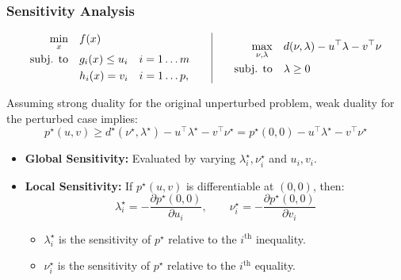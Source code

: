 \subsubsection{Sensitivity Analysis}

\[
\begin{array}{@{}c@{\qquad}|@{\qquad}c@{}}
    \begin{aligned}
        \min_{x} \quad & f(x) \\
        \text{subj. to} \quad & g_i(x) \le u_i \quad i=1\ldots m \\
        & h_i(x) = v_i \quad i=1\ldots p,
    \end{aligned}
    &
    \begin{aligned}
        \max_{\nu, \lambda} \quad & d(\nu, \lambda) - u^\top \lambda - v^\top \nu \\
        \text{subj. to} \quad & \lambda \ge 0
    \end{aligned}
\end{array}
\]

Assuming strong duality for the original unperturbed problem, weak duality for the perturbed case implies:
\[
    p^\star(u,v) \ge d^\star(\nu^\star, \lambda^\star) - u^\top\lambda^\star - v^\top\nu^\star = p^\star(0,0) - u^\top\lambda^\star - v^\top\nu^\star
\]

\begin{itemize}
    \item \textbf{Global Sensitivity:} Evaluated by varying $\lambda_i^\star, \nu_i^\star$ and $u_i, v_i$.
    
    \item \textbf{Local Sensitivity:} If $p^\star(u, v)$ is differentiable at $(0, 0)$, then:
    \[
        \lambda_i^\star = -\frac{\partial p^\star(0, 0)}{\partial u_i}, \qquad \nu_i^\star = -\frac{\partial p^\star(0, 0)}{\partial v_i}
    \]
    \begin{itemize}
        \item $\lambda_i^\star$ is the sensitivity of $p^\star$ relative to the $i^{\text{th}}$ inequality.
        \item $\nu_i^\star$ is the sensitivity of $p^\star$ relative to the $i^{\text{th}}$ equality.
    \end{itemize}
\end{itemize}

\vspace{2.5em}